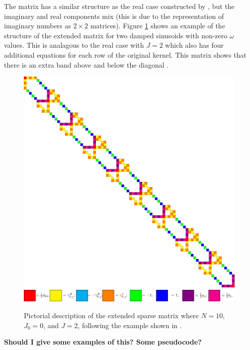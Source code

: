 \documentclass[manuscript, letterpaper]{aastex6}
\newcommand{\figurelabel}[1]{\label{fig:#1}}
\begin{document}
The matrix has a similar structure as the real case constructed by \citep{Ambikasaran:2015}, but the
imaginary and real components mix (this is due to the representation of imaginary numbers as
$2\times 2$ matrices).  Figure \ref{fig:matrix_structure} shows an example of the structure of the extended
matrix for two damped sinusoids with non-zero $\omega$ values.  This is analagous to the real case with
$J=2$ which also has four additional equations for each row of the original kernel.  This matrix shows
that there is an extra band above and below the diagonal \citep[compare with Figure 2 of][]{Ambikasaran:2015}.

\begin{figure}[!htbp]
\begin{center}
\includegraphics[scale=0.175]{./twoterm.pdf}
\hspace{0.2in}
\includegraphics[scale=0.85]{./colorcode.pdf}
\end{center}
\caption{Pictorial description of the extended sparse matrix where $N=10$, $J_0=0$, and $J=2$, following
the example shown in \citet{Ambikasaran:2015}.}
\figurelabel{matrix_structure}
\end{figure}

{\bf Should I give some examples of this?  Some pseudocode?}


\end{document}
